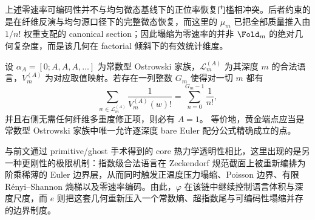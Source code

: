 \begin{remark}\label{rem:conclusion-factorial-canonical-section-vs-uniform-capacity}
上述零速率可编码性并不与均匀微态基线下的正位率恢复门槛相冲突。后者约束的是在纤维反演与均匀源口径下的完整微态恢复，而这里的 \(\mu_m\) 已把全部质量推入由 \(1/n!\) 权重支配的 canonical section；因此塌缩为零速率的并非 \(\Fold_m\) 的绝对几何复杂度，而是该几何在 factorial 倾斜下的有效统计维度。
\end{remark}

\begin{conjecture}\label{conj:conclusion-ostrowski-bare-euler-partition-uniqueness}
设 \(\alpha_A=[0;A,A,A,\dots]\) 为常数型 Ostrowski 家族，\(\mathcal L_m^{(A)}\) 为其深度 \(m\) 的合法语言，\(V_m^{(A)}\) 为对应取值映射。若存在一列整数 \(G_m\) 使得对一切 \(m\) 都有
\[
\sum_{w\in\mathcal L_m^{(A)}}\frac{1}{V_m^{(A)}(w)!}
=
\sum_{n=0}^{G_m-1}\frac{1}{n!},
\]
并且右侧无需任何纤维多重度修正项，则必有 \(A=1\)。
等价地，黄金端点应当是常数型 Ostrowski 家族中唯一允许逐深度 bare Euler 配分公式精确成立的点。
\end{conjecture}

\begin{remark}[冷端重标架与暴露相平台的另一极限机制]
与前文通过 primitive/ghost 手术得到的 core 热力学透明性相比，这里出现的是另一种更刚性的极限机制：指数级合法语言在 Zeckendorf 规范截面上被重新编排为阶乘稀薄的 Euler 边界层，从而同时触发正温度压力塌缩、Poisson 边界、有限 Rényi--Shannon 熵梯以及零速率编码。由此，\(\varphi\) 在该链中继续控制语言体积与深度尺度，而 \(e\) 则把这套几何重新压入一个常数熵、超指数尾与可编码性塌缩并存的边界制度。
\end{remark}

